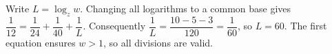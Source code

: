 Write $L=\log_zw$. Changing all logarithms to a common base gives $\dfrac{1}{12}=\dfrac{1}{24}+\dfrac{1}{40}+\dfrac{1}{L}$. Consequently $\dfrac{1}{L}=\dfrac{10-5-3}{120}=\dfrac{1}{60}$, so $\boxed{L=60}$. The first equation ensures $w>1$, so all divisions are valid.
